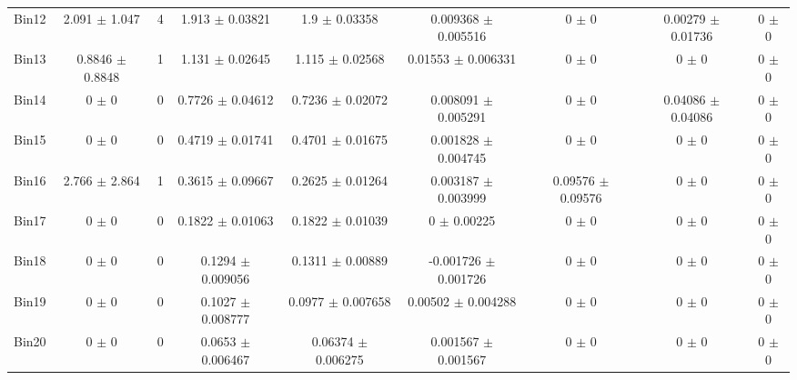 \begin{tabular}{@{\extracolsep{4pt}}lcccccccc@{}}
     Bin12 & 2.091 $\pm$ 1.047 & 4 & 1.913 $\pm$ 0.03821 & 1.9 $\pm$ 0.03358 & 0.009368 $\pm$ 0.005516 & 0 $\pm$ 0 & 0.00279 $\pm$ 0.01736 & 0 $\pm$ 0 \\ 
     Bin13 & 0.8846 $\pm$ 0.8848 & 1 & 1.131 $\pm$ 0.02645 & 1.115 $\pm$ 0.02568 & 0.01553 $\pm$ 0.006331 & 0 $\pm$ 0 & 0 $\pm$ 0 & 0 $\pm$ 0 \\ 
     Bin14 & 0 $\pm$ 0 & 0 & 0.7726 $\pm$ 0.04612 & 0.7236 $\pm$ 0.02072 & 0.008091 $\pm$ 0.005291 & 0 $\pm$ 0 & 0.04086 $\pm$ 0.04086 & 0 $\pm$ 0 \\ 
     Bin15 & 0 $\pm$ 0 & 0 & 0.4719 $\pm$ 0.01741 & 0.4701 $\pm$ 0.01675 & 0.001828 $\pm$ 0.004745 & 0 $\pm$ 0 & 0 $\pm$ 0 & 0 $\pm$ 0 \\ 
     Bin16 & 2.766 $\pm$ 2.864 & 1 & 0.3615 $\pm$ 0.09667 & 0.2625 $\pm$ 0.01264 & 0.003187 $\pm$ 0.003999 & 0.09576 $\pm$ 0.09576 & 0 $\pm$ 0 & 0 $\pm$ 0 \\ 
     Bin17 & 0 $\pm$ 0 & 0 & 0.1822 $\pm$ 0.01063 & 0.1822 $\pm$ 0.01039 & 0 $\pm$ 0.00225 & 0 $\pm$ 0 & 0 $\pm$ 0 & 0 $\pm$ 0 \\ 
     Bin18 & 0 $\pm$ 0 & 0 & 0.1294 $\pm$ 0.009056 & 0.1311 $\pm$ 0.00889 & -0.001726 $\pm$ 0.001726 & 0 $\pm$ 0 & 0 $\pm$ 0 & 0 $\pm$ 0 \\ 
     Bin19 & 0 $\pm$ 0 & 0 & 0.1027 $\pm$ 0.008777 & 0.0977 $\pm$ 0.007658 & 0.00502 $\pm$ 0.004288 & 0 $\pm$ 0 & 0 $\pm$ 0 & 0 $\pm$ 0 \\ 
     Bin20 & 0 $\pm$ 0 & 0 & 0.0653 $\pm$ 0.006467 & 0.06374 $\pm$ 0.006275 & 0.001567 $\pm$ 0.001567 & 0 $\pm$ 0 & 0 $\pm$ 0 & 0 $\pm$ 0 \\ 
\hline\hline
  \end{tabular}
